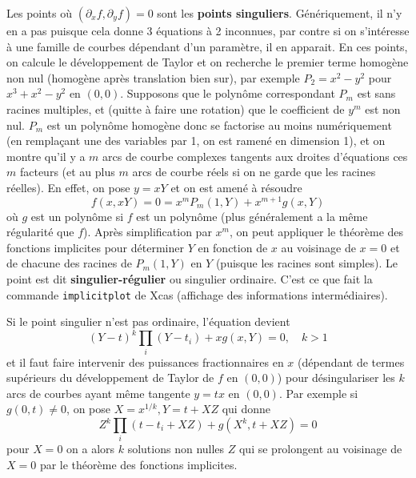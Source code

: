 \documentclass[a4paper,11pt]{article}
\begin{document}
\begin{giacjshere}
Les points o\`u $(\partial_x f,\partial_y f)=0$ sont
les {\bf points singuliers}. 
G\'en\'eriquement, il n'y en a pas puisque
cela donne 3 \'equations \`a 2 inconnues, par contre si on
s'int\'eresse \`a une famille de courbes d\'ependant d'un
param\`etre, il en apparait. En ces points, on calcule le
d\'eveloppement de Taylor et on recherche le premier
terme homog\`ene non nul (homog\`ene apr\`es translation bien sur), 
par exemple
$P_2=x^2-y^2$ pour $x^3+x^2-y^2$ en $(0,0)$. 
Supposons que le polyn\^ome
correspondant $P_m$ est sans racines multiples, et (quitte
\`a faire une rotation) que le coefficient de $y^m$ est non nul.
$P_m$ est un polyn\^ome homog\`ene 
donc se factorise au moins num\'eriquement
(en rempla\c{c}ant une des variables par 1, on est ramen\'e en dimension 1),
et on montre qu'il y a $m$ arcs de courbe complexes tangents
aux droites d'\'equations ces $m$ facteurs (et au plus
$m$ arcs de courbe r\'eels si on ne garde
que les racines r\'eelles). En effet, on pose $y=xY$ et on 
est amen\'e \`a r\'esoudre
$$ f(x,xY)=0=x^mP_m(1,Y) + x^{m+1} g(x,Y)$$
o\`u $g$ est un polyn\^ome si $f$ est un polyn\^ome 
(plus g\'en\'eralement a la m\^eme r\'egularit\'e que $f$). 
Apr\`es simplification par $x^m$, on peut appliquer le th\'eor\`eme des
fonctions implicites pour d\'eterminer $Y$ en fonction de $x$ au
voisinage de $x=0$ et de chacune des racines de $P_m(1,Y)$ en $Y$
(puisque les racines sont simples).
Le point 
est dit {\bf singulier-r\'egulier} ou
singulier ordinaire. 
C'est ce que fait la commande \verb|implicitplot| de Xcas
(affichage des informations interm\'ediaires).

Si le point singulier n'est pas ordinaire, l'\'equation devient
$$ (Y-t)^k \prod_i (Y-t_i) + xg(x,Y)=0, \quad k>1$$
et il faut faire intervenir des puissances fractionnaires en $x$
(d\'ependant de termes sup\'erieurs du d\'eveloppement de Taylor
de $f$ en $(0,0)$)
pour d\'esingulariser les $k$ arcs de courbes ayant m\^eme tangente
$y=tx$ en $(0,0)$. Par exemple si $g(0,t) \neq 0$, 
on pose $X=x^{1/k}, Y=t+XZ$
qui donne 
$$ Z^k \prod_i (t-t_i+XZ) + g(X^k,t+XZ)=0$$
pour $X=0$ on a alors $k$ solutions non nulles $Z$ qui
se prolongent au voisinage de $X=0$ par le th\'eor\`eme des
fonctions implicites.


\end{giacjshere}
\end{document}
